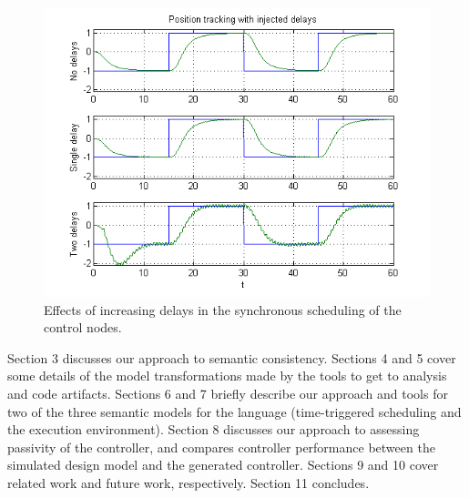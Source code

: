 \begin{figure}
\centering
\includegraphics[width=0.9\columnwidth]{figures/delays.png}
    \caption{Effects of increasing delays in the synchronous scheduling of the
control nodes.}
    \label{fig:delays}
\end{figure}

Section 3 discusses our approach to semantic consistency. Sections 4 and 5
cover some details of the model transformations made by the tools to get to
analysis and code artifacts. Sections 6 and 7 briefly describe our approach 
and tools for two of the three semantic models for the language (time-triggered 
scheduling and the execution environment).  Section 8 discusses our approach to 
assessing passivity of the controller, and compares controller performance between 
the simulated design model and the generated controller. Sections 9 and 10 cover 
related work and future work, respectively.  Section 11 concludes.

